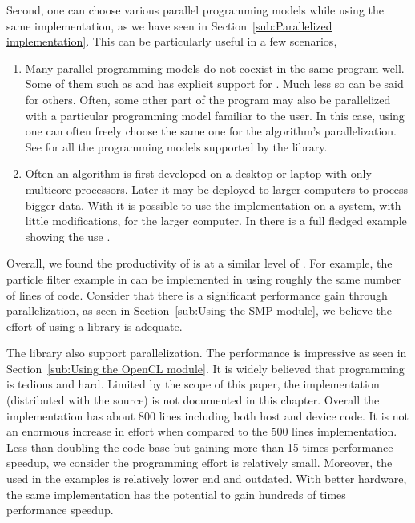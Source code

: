 Second, one can choose various parallel programming models while using the
same implementation, as we have seen in Section~\ref{sub:Parallelized
  implementation}. This can be particularly useful in a few scenarios,
\begin{enumerate}
  \item Many parallel programming models do not coexist in the same program
    well. Some of them such as \tbb and \cilk has explicit support for
    \openmp. Much less so can be said for others. Often, some other part of
    the program may also be parallelized with a particular programming model
    familiar to the user. In this case, using \vsmc one can often freely
    choose the same one for the \smc algorithm's parallelization. See
    \cite{vsmcjss} for all the programming models supported by the library.
  \item Often an algorithm is first developed on a desktop or laptop with only
    multicore processors. Later it may be deployed to larger computers to
    process bigger data. With \vsmc it is possible to use the implementation
    on a \smp system, with little modifications, for the larger computer. In
    \cite{vsmcjss} there is a full fledged example showing the use \mpi.
\end{enumerate}

Overall, we found the productivity of \vsmc is at a similar level of \smctc.
For example, the particle filter example in \cite{smctc} can be implemented in
\vsmc using roughly the same number of lines of code. Consider that there is a
significant performance gain through parallelization, as seen in
Section~\ref{sub:Using the SMP module}, we believe the effort of using a \cpp
library is adequate.

The library also support \opencl parallelization. The performance is
impressive as seen in Section~\ref{sub:Using the OpenCL module}. It is widely
believed that \opencl programming is tedious and hard. Limited by the scope of
this paper, the \opencl implementation (distributed with the \vsmc source) is
not documented in this chapter. Overall the \opencl implementation has about
800 lines including both host and device code. It is not an enormous increase
in effort when compared to the 500 lines \smp implementation. Less than
doubling the code base but gaining more than 15 times performance speedup, we
consider the programming effort is relatively small. Moreover, the \gpu used
in the examples is relatively lower end and outdated. With better hardware,
the same implementation has the potential to gain hundreds of times
performance speedup.


